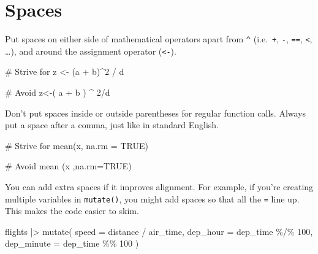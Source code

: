 \documentclass[
  letterpaper,
  DIV=11,
  numbers=noendperiod]{scrreprt}
\newenvironment{Shaded}{\begin{snugshade}}{\end{snugshade}}
\newcommand{\AttributeTok}[1]{\textcolor[rgb]{0.40,0.45,0.13}{#1}}
\newcommand{\CommentTok}[1]{\textcolor[rgb]{0.37,0.37,0.37}{#1}}
\newcommand{\ConstantTok}[1]{\textcolor[rgb]{0.56,0.35,0.01}{#1}}
\newcommand{\DecValTok}[1]{\textcolor[rgb]{0.68,0.00,0.00}{#1}}
\newcommand{\FunctionTok}[1]{\textcolor[rgb]{0.28,0.35,0.67}{#1}}
\newcommand{\NormalTok}[1]{\textcolor[rgb]{0.00,0.23,0.31}{#1}}
\newcommand{\OtherTok}[1]{\textcolor[rgb]{0.00,0.23,0.31}{#1}}
\newcommand{\SpecialCharTok}[1]{\textcolor[rgb]{0.37,0.37,0.37}{#1}}
\begin{document}
\section{Spaces}\label{spaces}

Put spaces on either side of mathematical operators apart from
\texttt{\^{}} (i.e.~\texttt{+}, \texttt{-}, \texttt{==},
\texttt{\textless{}}, \ldots), and around the assignment operator
(\texttt{\textless{}-}).

\begin{Shaded}
\begin{Highlighting}[]
\CommentTok{\# Strive for}
\NormalTok{z }\OtherTok{\textless{}{-}}\NormalTok{ (a }\SpecialCharTok{+}\NormalTok{ b)}\SpecialCharTok{\^{}}\DecValTok{2} \SpecialCharTok{/}\NormalTok{ d}

\CommentTok{\# Avoid}
\NormalTok{z}\OtherTok{\textless{}{-}}\NormalTok{( a }\SpecialCharTok{+}\NormalTok{ b ) }\SpecialCharTok{\^{}} \DecValTok{2}\SpecialCharTok{/}\NormalTok{d}
\end{Highlighting}
\end{Shaded}

Don't put spaces inside or outside parentheses for regular function
calls. Always put a space after a comma, just like in standard English.

\begin{Shaded}
\begin{Highlighting}[]
\CommentTok{\# Strive for}
\FunctionTok{mean}\NormalTok{(x, }\AttributeTok{na.rm =} \ConstantTok{TRUE}\NormalTok{)}

\CommentTok{\# Avoid}
\FunctionTok{mean}\NormalTok{ (x ,}\AttributeTok{na.rm=}\ConstantTok{TRUE}\NormalTok{)}
\end{Highlighting}
\end{Shaded}

You can add extra spaces if it improves alignment. For example, if
you're creating multiple variables in \texttt{mutate()}, you might add
spaces so that all the \texttt{=} line up. This makes the code easier to
skim.

\begin{Shaded}
\begin{Highlighting}[]
\NormalTok{flights }\SpecialCharTok{|\textgreater{}}
  \FunctionTok{mutate}\NormalTok{(}
    \AttributeTok{speed      =}\NormalTok{ distance }\SpecialCharTok{/}\NormalTok{ air\_time,}
    \AttributeTok{dep\_hour   =}\NormalTok{ dep\_time }\SpecialCharTok{\%/\%} \DecValTok{100}\NormalTok{,}
    \AttributeTok{dep\_minute =}\NormalTok{ dep\_time }\SpecialCharTok{\%\%}  \DecValTok{100}
\NormalTok{  )}
\end{Highlighting}
\end{Shaded}
\end{document}
